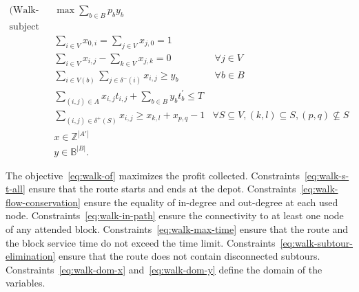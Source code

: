 \begin{align}
	\text{(Walk-CBRP) }          & \max \sum_{b \in B} p_b y_{b}                                             & \label{eq:walk-of}                                                                                 \\
	\nonumber \text{subject to:} &                                                                           &                                                                                                    \\
	                             & \sum_{i \in V} x_{0,i} = \sum_{j \in V} x_{j,0} = 1                       & \label{eq:walk-s-t-all}                                                                            \\
	                             & \sum_{i \in V} x_{i,j} - \sum_{k \in V} x_{j,k} = 0                       & \ \forall j \in V \label{eq:walk-flow-conservation}                                                \\
	                             & \sum_{i \in V(b)} \sum_{j \in \delta^{-}(i)} x_{i,j} \geq y_{b}           & \ \forall b \in B \label{eq:walk-in-path}                                                          \\
	                             & \sum_{(i, j) \in A} x_{i,j}t_{i,j} + \sum_{b \in B} y_{b}t^{'}_{b} \leq T & \label{eq:walk-max-time}                                                                           \\
	                             & \sum_{(i, j) \in \delta^{+}(S)} x_{i,j} \geq x_{k,l} + x_{p,q} - 1        & \forall S \subseteq V, (k, l) \subseteq S, (p, q) \nsubseteq S \label{eq:walk-subtour-elimination} \\
	                             & x \in \mathbb{Z}^{|A'|}                                                   & \label{eq:walk-dom-x}                                                                              \\
	                             & y \in \mathbb{B}^{|B|}.                                                   & \label{eq:walk-dom-y}
\end{align}

The objective~\eqref{eq:walk-of} maximizes the profit collected.
Constraints~\eqref{eq:walk-s-t-all} ensure that the route starts and ends at the
depot. Constraints~\eqref{eq:walk-flow-conservation} ensure the equality of in-degree and out-degree
at each used node. Constraints~\eqref{eq:walk-in-path} ensure the connectivity
to at least one node of any attended block. Constraints~\eqref{eq:walk-max-time}
ensure that the route and the block service time do not exceed the time limit.
Constraints~\eqref{eq:walk-subtour-elimination} ensure that the route does not
contain disconnected subtours. Constraints~\eqref{eq:walk-dom-x}
and~\eqref{eq:walk-dom-y} define the domain of the variables.

